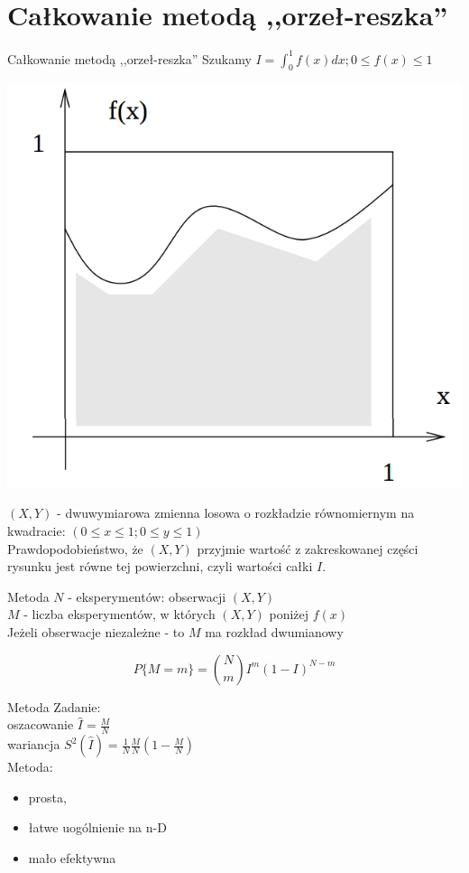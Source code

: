 \section{Całkowanie metodą ,,orzeł-reszka''}
\begin{frame}{Całkowanie metodą ,,orzeł-reszka''}
	Szukamy $I = \int_0^1 f(x) dx; 0 \le f(x) \le 1$
    
    {\centering 
    	\includegraphics[width=.4\linewidth]{img/15/15_1_orzel_reszka}
        \par
    }
    
    $(X, Y)$ - dwuwymiarowa zmienna losowa o rozkładzie równomiernym na kwadracie: $(0 \le x \le 1; 0 \le y \le 1)$ \\
    Prawdopodobieństwo, że $(X, Y)$ przyjmie wartość z zakreskowanej części rysunku jest równe tej powierzchni, czyli wartości całki $I$.
\end{frame}
\begin{frame}{Metoda}
	$N$ - eksperymentów: obserwacji $(X, Y)$ \\
    $M$ - liczba eksperymentów, w których $(X, Y)$ poniżej $f(x)$
    \\[8pt]
    Jeżeli obserwacje niezależne - to $M$ ma rozkład dwumianowy
    
    \[\boxed{
    	P\{M = m\} = \left.
            \binom{N}{m}
        \right. I^m (1-I)^{N-m}
    }\]
\end{frame}
\begin{frame}{Metoda}
	Zadanie:\\
    oszacowanie $\hat{I} = \frac{M}{N}$ \\
    wariancja $S^2(\hat{I}) = \frac{1}{N} \frac{M}{N} \left( 
    	1 - \frac{M}{N}
    \right)$ 
    \\[8pt]
    Metoda:
    \begin{itemize}
    	\item prosta,
        \item łatwe uogólnienie na n-D
        \item mało efektywna
    \end{itemize}
\end{frame}